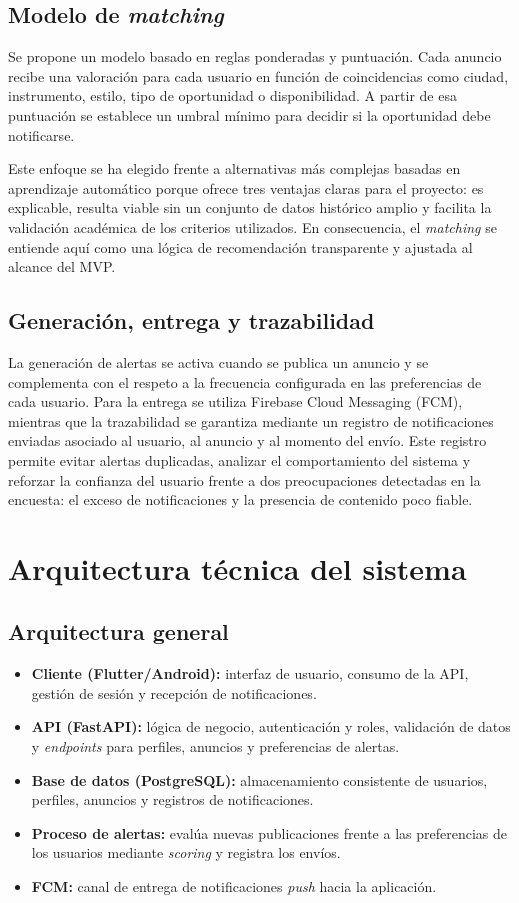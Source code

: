 \documentclass[12pt,a4paper]{report}
\begin{document}
\subsection{Modelo de \textit{matching}}
Se propone un modelo basado en reglas ponderadas y puntuación. Cada anuncio recibe una valoración para cada usuario en función de coincidencias como ciudad, instrumento, estilo, tipo de oportunidad o disponibilidad. A partir de esa puntuación se establece un umbral mínimo para decidir si la oportunidad debe notificarse.

Este enfoque se ha elegido frente a alternativas más complejas basadas en aprendizaje automático porque ofrece tres ventajas claras para el proyecto: es explicable, resulta viable sin un conjunto de datos histórico amplio y facilita la validación académica de los criterios utilizados. En consecuencia, el \textit{matching} se entiende aquí como una lógica de recomendación transparente y ajustada al alcance del MVP.

\subsection{Generación, entrega y trazabilidad}
La generación de alertas se activa cuando se publica un anuncio y se complementa con el respeto a la frecuencia configurada en las preferencias de cada usuario. Para la entrega se utiliza Firebase Cloud Messaging (FCM), mientras que la trazabilidad se garantiza mediante un registro de notificaciones enviadas asociado al usuario, al anuncio y al momento del envío. Este registro permite evitar alertas duplicadas, analizar el comportamiento del sistema y reforzar la confianza del usuario frente a dos preocupaciones detectadas en la encuesta: el exceso de notificaciones y la presencia de contenido poco fiable.

\section{Arquitectura técnica del sistema}

\subsection{Arquitectura general}

\begin{itemize}
  \item \textbf{Cliente (Flutter/Android):} interfaz de usuario, consumo de la API, gestión de sesión y recepción de notificaciones.
  \item \textbf{API (FastAPI):} lógica de negocio, autenticación y roles, validación de datos y \textit{endpoints} para perfiles, anuncios y preferencias de alertas.
  \item \textbf{Base de datos (PostgreSQL):} almacenamiento consistente de usuarios, perfiles, anuncios y registros de notificaciones.
  \item \textbf{Proceso de alertas:} evalúa nuevas publicaciones frente a las preferencias de los usuarios mediante \textit{scoring} y registra los envíos.
  \item \textbf{FCM:} canal de entrega de notificaciones \textit{push} hacia la aplicación.
\end{itemize}
\end{document}
